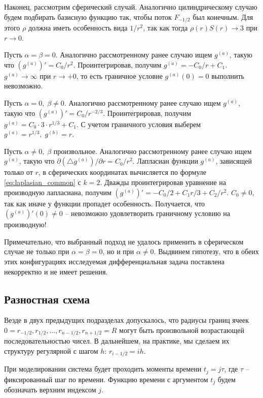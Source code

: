 Наконец, рассмотрим сферический случай. Аналогично цилиндрическому случаю будем подбирать базисную функцию так, чтобы поток $F_{-1/2}$ был конечным. Для этого $\rho$ должна иметь особенность вида $1/r^2$, так как тогда $\rho(r) S(r) \to 3$ при $r \to 0$.

Пусть $\alpha = \beta = 0$. Аналогично рассмотренному ранее случаю ищем $g^{(a)}$, такую что $(g^{(a)})' = C_0 / r^2$. Проинтегрировав, получим $g^{(a)} = -C_0 / r + C_1$. $g^{(a)} \to \infty$ при $r \to +0$, то есть граничное условие $g^{(a)}(0) = 0$ выполнить невозможно.

Пусть $\alpha = 0, \; \beta \neq 0$. Аналогично рассмотренному ранее случаю ищем $g^{(a)}$, такую что $(g^{(a)})' = C_0 / r^{-2/3}$. Проинтегрировав, получим $g^{(a)} = C_0 \cdot 3 \cdot r^{1/3} + C_1$. С учетом граничного условия выберем $g^{(a)} = r^{1/3}, \; g^{(b)} = r$.

Пусть $\alpha \neq 0, \; \beta$ произвольное. Аналогично рассмотренному ранее случаю ищем $g^{(a)}$, такую что $\partial (\triangle g^{(a)}) / \partial r = C_0 / r^2$. Лапласиан функции $g^{(a)}$, зависящей только от $r$, в сферических координатах вычисляется по формуле \eqref{eq:laplasian_common} с $k = 2$. Дважды проинтегрировав уравнение на производную лапласиана, получим $(g^{(a)})' = -C_0 / 2 + C_1 r / 3 + C_2 / r^2$. $C_0 \neq 0$, так как иначе у функции пропадет особенность. Получается, что $(g^{(a)})'(0) \neq 0$ -- невозможно удовлетворить граничному условию на производную!

Примечательно, что выбранный подход не удалось применить в сферическом случае не только при $\alpha = \beta = 0$, но и при $\alpha \neq 0$. Выдвинем гипотезу, что в обеих этих конфигурациях исследуемая дифференциальная задача поставлена некорректно и не имеет решения.


\subsection{Разностная схема}

Везде в двух предыдущих подразделах допускалось, что радиусы границ ячеек $0 = r_{-1/2}, r_{1/2}, ..., r_{n - 1/2}, r_{n + 1/2} = R$ могут быть произвольной возрастающей последовательностью чисел. В дальнейшем, на практике, мы сделаем их структуру регулярной с шагом $h$: $r_{i - 1/2} = ih$.

При моделировании система будет проходить моменты времени $t_j = j \tau$, где $\tau$ -- фиксированный шаг по времени. Функцию времени с аргументом $t_j$ будем обозначать верхним индексом $j$.

